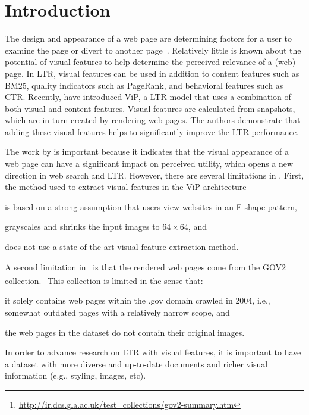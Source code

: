 
\section{Introduction}
The design and appearance of a web page are determining factors for a user to examine the page or divert to another page~\cite{nielsen1999designing,nielsen2006f,pernice2017f,wang2014eye}.
Relatively little is known about the potential of visual features to help determine the perceived relevance of a (web) page. In \ac{LTR}, visual features can be used in addition to content features such as BM25, quality indicators such as PageRank, and behavioral features such as CTR.
Recently, \citet{fan2017learning} have introduced ViP, a \ac{LTR} model that uses a combination of both visual and content features.
Visual features are calculated from snapshots, which are in turn created by rendering web pages.
The authors demonstrate that adding these visual features helps to significantly improve the \ac{LTR} performance.

The work by \citet{fan2017learning} is important because it indicates that the visual appearance of a web page can have a significant impact on perceived utility, which opens a new direction in web search and \ac{LTR}.
However, there are several limitations in \cite{fan2017learning}.
First, the method used to extract visual features in the ViP architecture
\begin{inparaenum}[(i)]
\item is based on a strong assumption that users view websites in an F-shape pattern, 
\item grayscales and shrinks the input images to $64\times64$, and
\item does not use a state-of-the-art visual feature extraction method.
\end{inparaenum}

A second limitation in~\citep{fan2017learning} is that
the rendered web pages come from the GOV2 collection.\footnote{\url{http://ir.dcs.gla.ac.uk/test_collections/gov2-summary.htm}}
This collection is limited in the sense that:
\begin{inparaenum}[(i)]
\item it solely contains web pages within the .gov domain crawled in 2004, i.e., somewhat outdated pages with a relatively narrow scope, and
\item the web pages in the dataset do not contain their original images.
\end{inparaenum}
In order to advance research on \ac{LTR} with visual features, it is important to have a dataset with more diverse and up-to-date documents and richer visual information (e.g., styling, images, etc).

